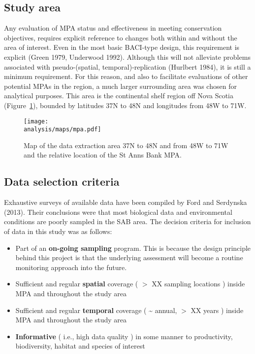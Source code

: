 \documentclass[letterpaper,portrait,11pt]{scrartcl}
\numberwithin{equation}{section}		%
\numberwithin{figure}{section}			%
\numberwithin{table}{section}				%
\newcommand{\ecomod}{\string~/ecomod_data/}   %
\newcommand{\analysis}{\ecomod/mpa/analysis/}   %
\begin{document}
\subsection{Study area}
Any evaluation of MPA status and effectiveness in meeting conservation objectives, requires explicit reference to changes both within and without the area of interest. Even in the most basic BACI-type design, this requirement is explicit (Green 1979, Underwood 1992). Although this will not alleviate problems associated with pseudo-(spatial, temporal)-replication (Hurlbert 1984), it is still a minimum requirement. For this reason, and also to facilitate evaluations of other potential MPAs in the region, a much larger surrounding area was chosen for analytical purposes. This area is the continental shelf region off Nova Scotia (Figure~\ref{fig:SAB}), bounded by latitudes 37N to 48N and longitudes from 48W to 71W.  

\begin{figure}[h]
  \label{fig:SAB}
  \centering
  \texttt{[image: \\analysis/maps/mpa.pdf]}
  \caption{Map of the data extraction area 37N to 48N and from 48W to 71W and the relative location of the St Anns Bank MPA.}
\end{figure}


\subsection{Data selection criteria}
Exhaustive surveys of available data have been compiled by Ford and Serdynska (2013). Their conclusions were that most biological data and environmental conditions are poorly sampled in the SAB area. 
The decision criteria for inclusion of data in this study was as follows:

\begin{itemize}
	\item Part of an \textbf{on-going sampling }program. This is because the design principle behind this project is that the underlying  assessment will become a routine monitoring approach into the future.
  \item	Sufficient and regular \textbf{spatial} coverage ( $>$ XX sampling locations ) inside MPA and throughout the study area
  \item Sufficient and regular \textbf{temporal} coverage ( \~{} annual, $>$ XX years ) inside MPA and throughout the study area
  \item \textbf{Informative} ( i.e., high data quality ) in some manner to productivity, biodiversity, habitat and species of interest
\end{itemize}
\end{document}
